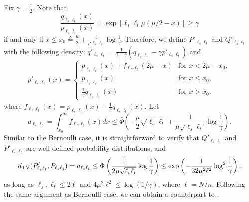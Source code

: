 Fix $\gamma = \frac{1}{2}$.
Note that
\[
\frac{q_{\ell_s\ell_t}(x)}{p_{\ell_s\ell_t}(x)} = \exp \left[ \ell_s \ell_t \mu ( \mu/2 -x) \right] \geq \gamma
\]
if and only if $x \leq x_0 \triangleq \frac{\mu}{2}+\frac{1}{\mu\ell_s\ell_t} \log \frac{1}{\gamma}$.
Therefore, we define $P'_{\ell_s\ell_t}$ and $Q'_{\ell_s\ell_t}$ with the following density:
$q'_{\ell_s \ell_t} = \frac{1}{1-\gamma} (q_{\ell_s \ell_t} - \gamma p'_{\ell_s \ell_t})$ and 
  \begin{align*}
    p'_{\ell_s \ell_t} (x)= 
		\left\{
    \begin{array}{rl}
    p_{\ell_s \ell_t}(x) + f_{\ell s \ell_t} (2\mu-x ) & \text{for } x < 2\mu- x_0,\\
    p_{\ell_s \ell_t}(x) & \text{for } x \le x_0, \\
    \frac{1}{\gamma} q_{\ell_s \ell_t} (x) & \text{for } x>x_0.
    \end{array} \right.
    \end{align*}
    where $f_{\ell s \ell_t} (x) = p_{\ell_s \ell_t}(x) - \frac{1}{\gamma} q_{\ell_s \ell_t}(x)$.
    Let
    $$
    a_{\ell_s \ell_t}=\int_{x_0}^{\infty} f_{\ell s \ell_t} (x) dx
    \leq \bar\Phi \left( - \frac{\mu}{2}\sqrt{\ell_s\ell_t} + \frac{1}{\mu\sqrt{\ell_s\ell_t}} \log \frac{1}{\gamma} \right).
    $$	
Similar to the Bernoulli case, it is straightforward to verify that $Q'_{\ell_s \ell_t}$ and $P'_{\ell_s \ell_t}$ are well-defined probability distributions, and
\begin{align}
d_{\rm TV} ( P'_{\ell_s \ell_t}, P_{\ell_s\ell_t} )
=a_{\ell_s \ell_t} 
 \le \bar\Phi \left(\frac{1}{2\mu\sqrt{\ell_s\ell_t}} \log \frac{1}{\gamma} \right) 
\leq \exp\left(- \frac{1}{32 \mu^2 \ell^2} \log^2 \frac{1}{\gamma} \right). \label{eq:TV_bound-gaussian}
\end{align}
as long as $\ell_s, \ell_t \le 2 \ell$ and $4 \mu^2 \ell^2 \le \log (1/\gamma)$, where $\ell=N/n$. 
Following the same argument as Bernoulli case, we can obtain a counterpart to .
